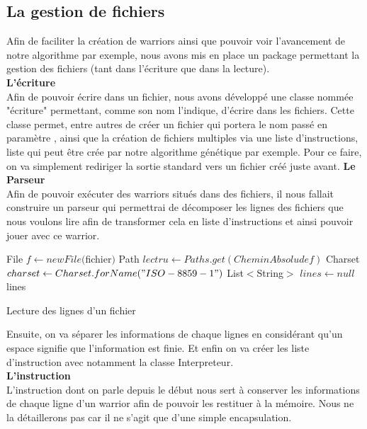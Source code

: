 \documentclass[a4paper,12pt]{article}
\begin{document}
\subsection{La gestion de fichiers}
Afin de faciliter la création de warriors ainsi que pouvoir voir l'avancement de notre algorithme par exemple, nous avons mis en place un package permettant la gestion des fichiers (tant dans l'écriture que dans la lecture).\\
\textbf{L'écriture}\\
Afin de pouvoir écrire dans un fichier, nous avons développé une classe nommée "écriture" permettant, comme son nom l'indique, d'écrire dans les fichiers. Cette classe permet, entre autres de créer un fichier qui portera le nom passé en paramètre , ainsi que la création de fichiers multiples via une liste d'instructions, liste qui peut être crée par notre algorithme génétique par exemple. Pour ce faire, on va simplement rediriger la sortie standard vers un fichier créé juste avant.
\bigbreak
\textbf{Le Parseur}\\
Afin de pouvoir exécuter des warriors situés dans des fichiers, il nous fallait construire un parseur qui permettrai de décomposer les lignes des fichiers que nous voulons lire afin de transformer cela en liste d'instructions et ainsi pouvoir jouer avec ce warrior.\\
\begin{algorithm}[H]
\DontPrintSemicolon
{}
File $f \gets new File($fichier$)$\;
Path $lectru \gets Paths.get(Chemin Absolu de f)$\;
Charset $charset \gets Charset.forName("ISO-8859-1")$\;
List$<$String$>$ $lines \gets null$\;
\Return lines
\caption{{\sc Lecture des lignes d'un fichier}} 

\end{algorithm}

\pagebreak
Ensuite, on va séparer les informations de chaque lignes en considérant qu'un espace signifie que l'information est finie. Et enfin on va créer les liste d'instruction avec notamment la classe Interpreteur.\\
\textbf{L'instruction}\\
L'instruction dont on parle depuis le début nous sert à conserver les informations de  chaque ligne d'un warrior afin de pouvoir les restituer à la mémoire. Nous ne la détaillerons pas car il ne s'agit que d'une simple encapsulation.\\
\end{document}
